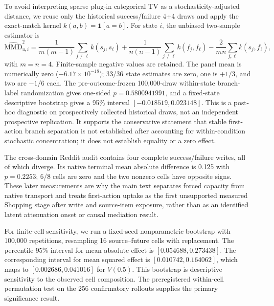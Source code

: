 To avoid interpreting sparse plug-in categorical TV as a stochasticity-adjusted distance, we reuse only the historical success/failure 4+4 draws and apply the exact-match kernel $k(a,b)=\mathbf{1}[a=b]$. For state $i$, the unbiased two-sample estimator is
\[
\widehat{\mathrm{MMD}}^2_{u,i}=
\frac{1}{m(m-1)}\sum_{j\ne \ell}k(s_j,s_\ell)
+\frac{1}{n(n-1)}\sum_{j\ne \ell}k(f_j,f_\ell)
-\frac{2}{mn}\sum_{j,\ell}k(s_j,f_\ell),
\]
with $m=n=4$. Finite-sample negative values are retained. The panel mean is numerically zero ($-6.17\times10^{-18}$); 33/36 state estimates are zero, one is $+1/3$, and two are $-1/6$ each. The pre-outcome-frozen 100,000-draw within-state branch-label randomization gives one-sided $p=0.5800941991$, and a fixed-state descriptive bootstrap gives a 95\% interval $[-0.018519,0.023148]$. This is a post-hoc diagnostic on prospectively collected historical draws, not an independent prospective replication. It supports the conservative statement that stable first-action branch separation is not established after accounting for within-condition stochastic concentration; it does not establish equality or a zero effect.

The cross-domain Reddit audit contains four complete success/failure writes, all of which diverge. Its native terminal mean absolute difference is 0.125 with $p=0.2253$; 6/8 cells are zero and the two nonzero cells have opposite signs. These later measurements are why the main text separates forced capacity from native transport and treats first-action uptake as the first unsupported measured Shopping stage after write and source-item exposure, rather than as an identified latent attenuation onset or causal mediation result.

For finite-cell sensitivity, we run a fixed-seed nonparametric bootstrap with 100,000 repetitions, resampling 16 source--future cells with replacement. The percentile 95\% interval for mean absolute effect is $[0.054688,0.273438]$. The corresponding interval for mean squared effect is $[0.010742,0.164062]$, which maps to $[0.002686,0.041016]$ for $V(0.5)$. This bootstrap is descriptive sensitivity to the observed cell composition. The preregistered within-cell permutation test on the 256 confirmatory rollouts supplies the primary significance result.

